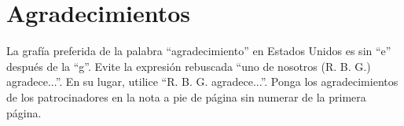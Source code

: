 \section*{Agradecimientos}

La grafía preferida de la palabra ``agradecimiento'' en Estados Unidos es sin ``e'' después de la ``g''. Evite la expresión rebuscada ``uno de nosotros (R. B. G.) agradece...''. En su lugar, utilice ``R. B. G. agradece...''. Ponga los agradecimientos de los patrocinadores en la nota a pie de página sin numerar de la primera página.